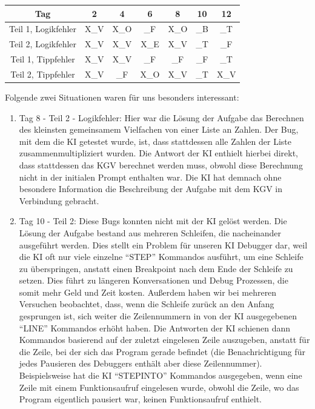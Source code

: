 \documentclass[a4paper,12pt,ngerman]{scrartcl}
\begin{document}
\begin{center}
\begin{tabular}{|c|c|c|c|c|c|c|}
	\hline
 	Tag                 &  2  &  4  &  6  &  8  & 10  & 12  \\
	\hline
	Teil 1, Logikfehler & X_V & X_O &  _F & X_O &  _B &  _T \\
	Teil 2, Logikfehler & X_V & X_V & X_E & X_V &  _T &  _F \\
	Teil 1, Tippfehler  & X_V & X_V &  _F &  _F &  _F &  _T \\
	Teil 2, Tippfehler  & X_V &  _F & X_O & X_V &  _T & X_V \\
	\hline
\end{tabular}
\end{center}

Folgende zwei Situationen waren für uns besonders interessant:
\begin{enumerate}
\item Tag 8 - Teil 2 - Logikfehler: Hier war die Lösung der Aufgabe das Berechnen des kleinsten gemeinsamem Vielfachen von einer Liste an Zahlen. Der Bug, mit dem die KI getestet wurde, ist, dass stattdessen alle Zahlen der Liste zusammenmultipliziert wurden. Die Antwort der KI enthielt hierbei direkt, dass stattdessen das KGV berechnet werden muss, obwohl diese Berechnung nicht in der initialen Prompt enthalten war. Die KI hat demnach ohne besondere Information die Beschreibung der Aufgabe mit dem KGV in Verbindung gebracht.
\item Tag 10 - Teil 2: Diese Bugs konnten nicht mit der KI gelöst werden. Die Lösung der Aufgabe bestand aus mehreren Schleifen, die nacheinander ausgeführt werden. Dies stellt ein Problem für unseren KI Debugger dar, weil die KI oft nur viele einzelne ``STEP'' Kommandos ausführt, um eine Schleife zu überspringen, anstatt einen Breakpoint nach dem Ende der Schleife zu setzen. Dies führt zu längeren Konversationen und Debug Prozessen, die somit mehr Geld und Zeit kosten. Außerdem haben wir bei mehreren Versuchen beobachtet, dass, wenn die Schleife zurück an den Anfang gesprungen ist, sich weiter die Zeilennummern in von der KI ausgegebenen ``LINE'' Kommandos erhöht haben. Die Antworten der KI schienen dann Kommandos basierend auf der zuletzt eingelesen Zeile auszugeben, anstatt für die Zeile, bei der sich das Program gerade befindet (die Benachrichtigung für jedes Pausieren des Debuggers enthält aber diese Zeilennummer). Beispielsweise hat die KI ``STEPINTO'' Kommandos ausgegeben, wenn eine Zeile mit einem Funktionsaufruf eingelesen wurde, obwohl die Zeile, wo das Program eigentlich pausiert war, keinen Funktionsaufruf enthielt.
\end{enumerate}
\end{document}
